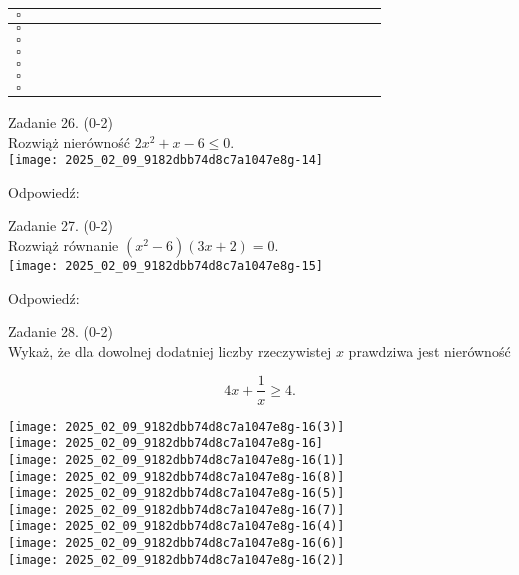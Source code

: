 \documentclass[10pt]{article}
\begin{document}
\begin{center}
\begin{tabular}{|c|c|c|c|c|c|c|c|c|c|c|c|c|c|c|c|c|c|c|c|c|c|c|}
\hline
\(\square\) &  &  &  &  &  &  &  &  &  &  &  &  &  &  &  &  &  &  &  &  &  &  \\
\hline
\(\square\) &  &  &  &  &  &  &  &  &  &  &  &  &  &  &  &  &  &  &  &  &  &  \\
\hline
\(\square\) &  &  &  &  &  &  &  &  &  &  &  &  &  &  &  &  &  &  &  &  &  &  \\
\hline
\(\square\) &  &  &  &  &  &  &  &  &  &  &  &  &  &  &  &  &  &  &  &  &  &  \\
\hline
\(\square\) &  &  &  &  &  &  &  &  &  &  &  &  &  &  &  &  &  &  &  &  &  &  \\
\hline
\(\square\) &  &  &  &  &  &  &  &  &  &  &  &  &  &  &  &  &  &  &  &  &  &  \\
\hline
\(\square\) &  &  &  &  &  &  &  &  &  &  &  &  &  &  &  &  &  &  &  &  &  &  \\
\hline
\end{tabular}
\end{center}

Zadanie 26. (0-2)\\
Rozwiąż nierówność \(2 x^{2}+x-6 \leq 0\).\\
\texttt{[image: 2025\_02\_09\_9182dbb74d8c7a1047e8g-14]}

Odpowiedź:

Zadanie 27. (0-2)\\
Rozwiąż równanie \(\left(x^{2}-6\right)(3 x+2)=0\).\\
\texttt{[image: 2025\_02\_09\_9182dbb74d8c7a1047e8g-15]}

Odpowiedź:

Zadanie 28. (0-2)\\
Wykaż, że dla dowolnej dodatniej liczby rzeczywistej \(x\) prawdziwa jest nierówność

\[
4 x+\frac{1}{x} \geq 4 .
\]

\texttt{[image: 2025\_02\_09\_9182dbb74d8c7a1047e8g-16(3)]}\\
\texttt{[image: 2025\_02\_09\_9182dbb74d8c7a1047e8g-16]}\\
\(\qquad\)\\
\texttt{[image: 2025\_02\_09\_9182dbb74d8c7a1047e8g-16(1)]}\\
\(\qquad\)\\
\texttt{[image: 2025\_02\_09\_9182dbb74d8c7a1047e8g-16(8)]}\\
\texttt{[image: 2025\_02\_09\_9182dbb74d8c7a1047e8g-16(5)]}\\
\texttt{[image: 2025\_02\_09\_9182dbb74d8c7a1047e8g-16(7)]}\\
\texttt{[image: 2025\_02\_09\_9182dbb74d8c7a1047e8g-16(4)]}\\
\(\qquad\)\\
\texttt{[image: 2025\_02\_09\_9182dbb74d8c7a1047e8g-16(6)]}\\
\texttt{[image: 2025\_02\_09\_9182dbb74d8c7a1047e8g-16(2)]}
\end{document}
